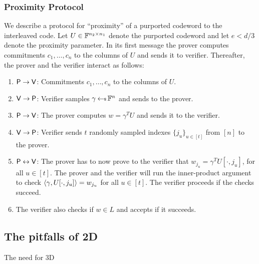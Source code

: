 \subsubsection{Proximity Protocol}\label{sec:proximity2D}
We describe a protocol for ``proximity'' of a purported codeword to the
interleaved code. Let $U\in \mathbb{F}^{n_2\times n_1}$ denote the purported codeword and let
$e< d/3$ denote the proximity parameter. 
In its first message the
prover computes commitments $c_1,\ldots,c_n$ to the columns of $U$ and
sends it to verifier. Thereafter, the prover and the verifier interact as
follows:
\begin{enumerate}[{\rm 1.}]
\item $\mathsf{P}\rightarrow \mathsf{V}$: Commitments $c_1,\ldots,c_n$ to the columns of $U$.
\item $\mathsf{V}\rightarrow \mathsf{P}$: Verifier samples $\gamma \hskip2.3pt{\gets\!\!\mbox{\tiny${\$}$\normalsize}}\, \mathbb{F}^n$ and sends to the prover.
\item $\mathsf{P}\rightarrow \mathsf{V}$: The prover computes $w=\gamma^T U$ and sends it to the verifier. 
\item $\mathsf{V}\rightarrow \mathsf{P}$: Verifier sends $t$ randomly sampled indexes $\{j_u\}_{u\in [t]}$ from $[n]$ to the prover.
\item $\mathsf{P}\leftrightarrow\mathsf{V}$: The prover has to now prove to the verifier that $w_{j_u} = \gamma^T U[\cdot, j_u]$, for all $u \in [t]$. The prover and the verifier will run the inner-product argument to check $\langle \gamma,U[\cdot, j_u]\rangle = w_{j_u}$ for all $u \in [t]$. The verifier proceeds if the checks succeed.
\item The verifier also checks if  $w\in L$ and accepts if it succeeds.
\end{enumerate}

\subsection{The pitfalls of 2D}
The need for 3D